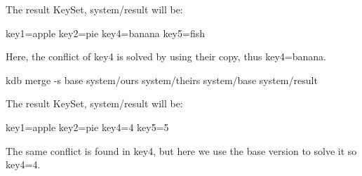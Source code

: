The result Key\+Set, {\ttfamily system/result} will be\+:


\begin{DoxyCode}
key1=apple
key2=pie
key4=banana
key5=fish
\end{DoxyCode}


Here, the conflict of {\ttfamily key4} is solved by using their copy, thus {\ttfamily key4=banana}.


\begin{DoxyCode}
kdb merge -s base system/ours system/theirs system/base system/result
\end{DoxyCode}


The result Key\+Set, {\ttfamily system/result} will be\+:


\begin{DoxyCode}
key1=apple
key2=pie
key4=4
key5=5
\end{DoxyCode}


The same conflict is found in {\ttfamily key4}, but here we use the {\ttfamily base} version to solve it so {\ttfamily key4=4}. 